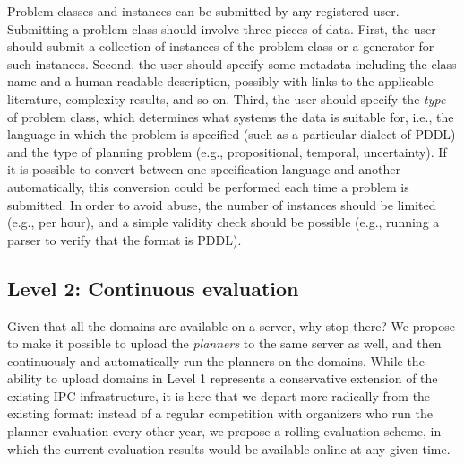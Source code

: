 Problem classes and instances can be submitted by any registered user. 
Submitting a problem class should involve three pieces of data. First,
the user should submit a collection of instances of the problem class or
a generator for such instances.  Second, the user should specify some
metadata including the class name and a human-readable description,
possibly with links to the applicable literature, complexity results, and
so on.  Third, the user should specify the \emph{type} of problem class,
which determines what systems the data is suitable for, i.e., the language
in which the problem is specified (such as a particular dialect of PDDL)
and the type of planning problem (e.g., propositional,
temporal, uncertainty).  If it is possible to convert between one
specification language and another automatically, this conversion could be
performed each time a problem is submitted.
In order to avoid abuse, the number of instances should be limited (e.g.,
per hour), and a simple validity check should be possible (e.g., running a
parser to verify that the format is PDDL).



\subsection{Level 2: Continuous evaluation}

Given that all the domains are available on a server, why stop
there?  We propose to make it possible to upload the \emph{planners}
to the same server as well, and then continuously and automatically
run the planners on the domains.  While the ability to upload domains
in Level 1 represents a conservative extension of the existing IPC
infrastructure, it is here that we depart more radically from the
existing format: instead of a regular competition with organizers who
run the planner evaluation every other year, we propose a rolling
evaluation scheme, in which the current evaluation results would be
available online at any given time.

